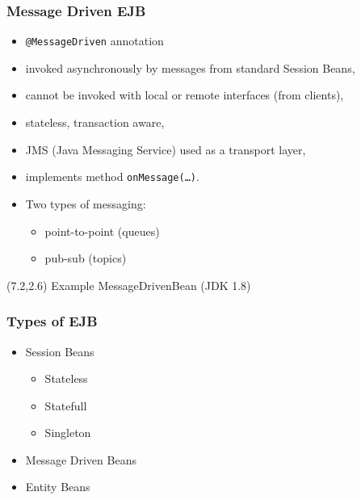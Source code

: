 \documentclass[10pt,xcolor=pdflatex]{beamer}
\begin{document}
\begin{frame}\frametitle{Message Driven EJB}
	\begin{itemize}
		\item \texttt{@MessageDriven} annotation
		\item invoked asynchronously by messages from standard Session Beans,
		\item cannot be invoked with local or remote interfaces (from clients),
		\item stateless, transaction aware,
		\item JMS (Java Messaging Service) used as a transport layer,
		\item implements method \texttt{onMessage(\ldots)}.
		\item Two types of messaging:
          \begin{itemize}
        	\item point-to-point (queues)
        	\item pub-sub (topics)
          \end{itemize}
	\end{itemize}
\begin{textblock}{10}(7.2,2.6)
    {\footnotesize Example MessageDrivenBean (JDK 1.8)}
\end{textblock}
\end{frame}


\begin{frame}\frametitle{Types of EJB}
	\begin{itemize}
		\item Session Beans
		  \begin{itemize}
		      \item Stateless
		      \item Statefull
		      \item Singleton
		  \end{itemize}
		\item Message Driven Beans
		\item Entity Beans
	\end{itemize}
\end{frame}
\end{document}
